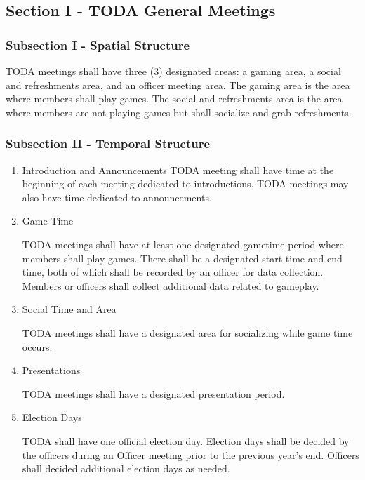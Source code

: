 \documentclass[11pt]{article}
\begin{document}
\subsection{Section I - TODA General Meetings}
\label{sec:org6708ffd}

\subsubsection{Subsection I - Spatial Structure}
\label{sec:org3b1e83b}

TODA meetings shall have three (3) designated areas: 
a gaming area, a social and refreshments area, and an officer meeting area. 
The gaming area is the area where members shall play games. 
The social and refreshments area is the area where members are not playing games but shall socialize and grab refreshments.

\subsubsection{Subsection II - Temporal Structure}
\label{sec:org1029b24}

\begin{enumerate}
\item Introduction and Announcements
\label{sec:org7cb1e57}
TODA meeting shall have time at the beginning of each meeting dedicated to introductions. 
TODA meetings may also have time dedicated to announcements.

\item Game Time
\label{sec:org2e4c525}

TODA meetings shall have at least one designated gametime period where members shall play games. 
There shall be a designated start time and end time, both of which shall be recorded by an officer for data collection. 
Members or officers shall collect additional data related to gameplay.

\item Social Time and Area
\label{sec:org5b26ebe}

TODA meetings shall have a designated area for socializing while game time occurs.

\item Presentations
\label{sec:orgdf923e0}

TODA meetings shall have a designated presentation period.


\item Election Days
\label{sec:org516bf00}

TODA shall have one official election day. 
Election days shall be decided by the officers during an Officer meeting prior to the previous year’s end. 
Officers shall decided additional election days as needed.
\end{enumerate}
\end{document}
